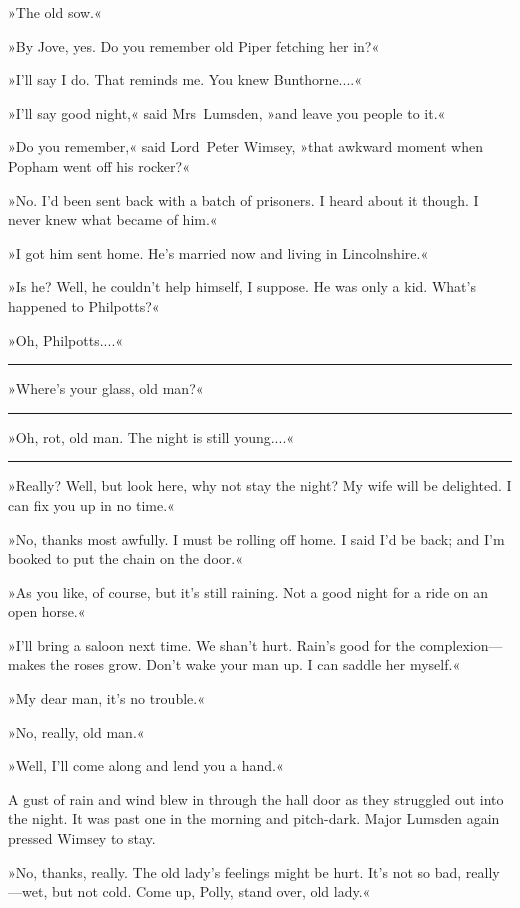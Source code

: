 »The old sow.«

»By Jove, yes. Do you remember old Piper fetching her in?«

»I'll say I do. That reminds me. You knew Bunthorne....«

»I'll say good night,« said Mrs~Lumsden, »and leave you people to it.«

»Do you remember,« said Lord~Peter Wimsey, »that awkward moment when Popham went off his rocker?«

»No. I'd been sent back with a batch of prisoners. I heard about it though. I never knew what became of him.«

»I got him sent home. He's married now and living in Lincolnshire.«

»Is he? Well, he couldn't help himself, I suppose. He was only a kid. What's happened to Philpotts?«

»Oh, Philpotts....«

\noindent\hfil\rule{0.5\textwidth}{.4pt}\hfil 

»Where's your glass, old man?«

\noindent\hfil\rule{0.5\textwidth}{.4pt}\hfil 

»Oh, rot, old man. The night is still young....«

\noindent\hfil\rule{0.5\textwidth}{.4pt}\hfil 

»Really? Well, but look here, why not stay the night? My wife will be delighted. I can fix you up in no time.«

»No, thanks most awfully. I must be rolling off home. I said I'd be back; and I'm booked to put the chain on the door.«

»As you like, of course, but it's still raining. Not a good night for a ride on an open horse.«

»I'll bring a saloon next time. We shan't hurt. Rain's good for the complexion—makes the roses grow. Don't wake your man up. I can saddle her myself.«

»My dear man, it's no trouble.«

»No, really, old man.«

»Well, I'll come along and lend you a hand.«

A gust of rain and wind blew in through the hall door as they struggled out into the night. It was past one in the morning and pitch-dark. Major Lumsden again pressed Wimsey to stay.

»No, thanks, really. The old lady's feelings might be hurt. It's not so bad, really—wet, but not cold. Come up, Polly, stand over, old lady.«

